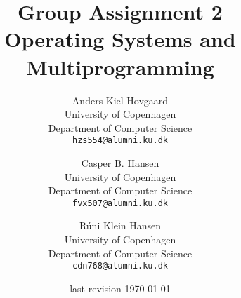 \documentclass[11pt]{article}
\title
{
    {\Large Group Assignment 2} \\
    Operating Systems and Multiprogramming
}
\author
{
    Anders Kiel Hovgaard \\
    University of Copenhagen \\
    Department of Computer Science \\
    {\tt hzs554@alumni.ku.dk}
    \and
    Casper B. Hansen \\
    University of Copenhagen \\
    Department of Computer Science \\
    {\tt fvx507@alumni.ku.dk}
    \and
    Rúni Klein Hansen \\
    University of Copenhagen \\
    Department of Computer Science \\
    {\tt cdn768@alumni.ku.dk}
}
\date{last revision \today}
\begin{document}
\clearpage
\maketitle
\thispagestyle{empty}
\begin{multicols}{2}
    \begin{abstract}
    
    \end{abstract}
    \vfill\columnbreak
    \tableofcontents\vfill
\end{multicols}
\newpage



\end{document}
